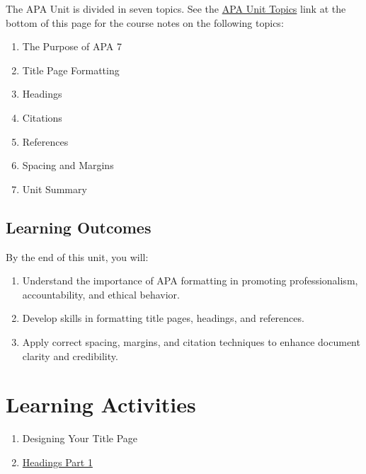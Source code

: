 \documentclass[
  letterpaper,
  DIV=11,
  numbers=noendperiod]{scrreprt}
\providecommand{\tightlist}{%
  \setlength{\itemsep}{0pt}\setlength{\parskip}{0pt}}\usepackage{longtable,booktabs,array}
\begin{document}
The APA Unit is divided in seven topics. See the
\href{https://learn.twu.ca/mod/book/view.php?id=1172203}{APA Unit
Topics} link at the bottom of this page for the course notes on the
following topics:

\begin{enumerate}
\def\labelenumi{\arabic{enumi}.}
\tightlist
\item
  The Purpose of APA 7
\item
  Title Page Formatting
\item
  Headings
\item
  Citations
\item
  References
\item
  Spacing and Margins
\item
  Unit Summary
\end{enumerate}

\subsection*{Learning Outcomes}\label{learning-outcomes-2}

By the end of this unit, you will:

\begin{enumerate}
\def\labelenumi{\arabic{enumi}.}
\tightlist
\item
  Understand the importance of APA formatting in promoting
  professionalism, accountability, and ethical behavior.
\item
  Develop skills in formatting title pages, headings, and references.
\item
  Apply correct spacing, margins, and citation techniques to enhance
  document clarity and credibility.
\end{enumerate}

\section*{Learning Activities}\label{learning-activities-6}


\begin{enumerate}
\def\labelenumi{\arabic{enumi}.}
\tightlist
\item
  Designing Your Title Page
\item
  \href{https://learn.twu.ca/mod/resource/view.php?id=1176289}{Headings
  Part 1}
\end{enumerate}
\end{document}
